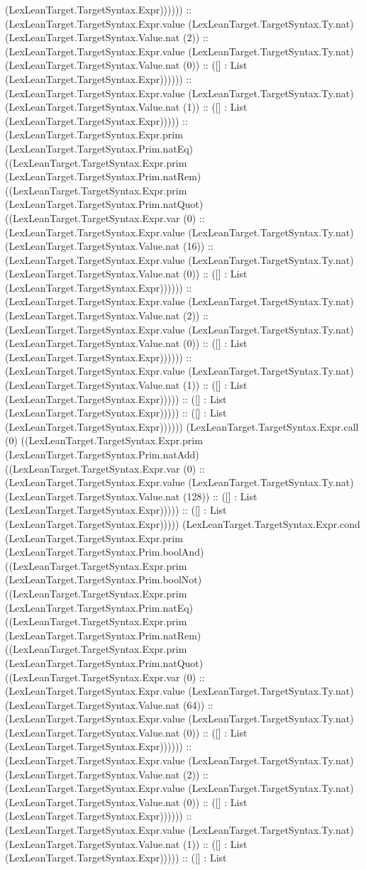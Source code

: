 \documentclass[11pt]{article}
\begin{document}
(LexLeanTarget.TargetSyntax.Expr)))))) :: (LexLeanTarget.TargetSyntax.Expr.value (LexLeanTarget.TargetSyntax.Ty.nat) (LexLeanTarget.TargetSyntax.Value.nat (2)) :: (LexLeanTarget.TargetSyntax.Expr.value (LexLeanTarget.TargetSyntax.Ty.nat) (LexLeanTarget.TargetSyntax.Value.nat (0)) :: ([] : List (LexLeanTarget.TargetSyntax.Expr)))))) :: (LexLeanTarget.TargetSyntax.Expr.value (LexLeanTarget.TargetSyntax.Ty.nat) (LexLeanTarget.TargetSyntax.Value.nat (1)) :: ([] : List (LexLeanTarget.TargetSyntax.Expr))))) :: (LexLeanTarget.TargetSyntax.Expr.prim (LexLeanTarget.TargetSyntax.Prim.natEq) ((LexLeanTarget.TargetSyntax.Expr.prim (LexLeanTarget.TargetSyntax.Prim.natRem) ((LexLeanTarget.TargetSyntax.Expr.prim (LexLeanTarget.TargetSyntax.Prim.natQuot) ((LexLeanTarget.TargetSyntax.Expr.var (0) :: (LexLeanTarget.TargetSyntax.Expr.value (LexLeanTarget.TargetSyntax.Ty.nat) (LexLeanTarget.TargetSyntax.Value.nat (16)) :: (LexLeanTarget.TargetSyntax.Expr.value (LexLeanTarget.TargetSyntax.Ty.nat) (LexLeanTarget.TargetSyntax.Value.nat (0)) :: ([] : List (LexLeanTarget.TargetSyntax.Expr)))))) :: (LexLeanTarget.TargetSyntax.Expr.value (LexLeanTarget.TargetSyntax.Ty.nat) (LexLeanTarget.TargetSyntax.Value.nat (2)) :: (LexLeanTarget.TargetSyntax.Expr.value (LexLeanTarget.TargetSyntax.Ty.nat) (LexLeanTarget.TargetSyntax.Value.nat (0)) :: ([] : List (LexLeanTarget.TargetSyntax.Expr)))))) :: (LexLeanTarget.TargetSyntax.Expr.value (LexLeanTarget.TargetSyntax.Ty.nat) (LexLeanTarget.TargetSyntax.Value.nat (1)) :: ([] : List (LexLeanTarget.TargetSyntax.Expr))))) :: ([] : List (LexLeanTarget.TargetSyntax.Expr))))) :: ([] : List (LexLeanTarget.TargetSyntax.Expr)))))) (LexLeanTarget.TargetSyntax.Expr.call (0) ((LexLeanTarget.TargetSyntax.Expr.prim (LexLeanTarget.TargetSyntax.Prim.natAdd) ((LexLeanTarget.TargetSyntax.Expr.var (0) :: (LexLeanTarget.TargetSyntax.Expr.value (LexLeanTarget.TargetSyntax.Ty.nat) (LexLeanTarget.TargetSyntax.Value.nat (128)) :: ([] : List (LexLeanTarget.TargetSyntax.Expr))))) :: ([] : List (LexLeanTarget.TargetSyntax.Expr))))) (LexLeanTarget.TargetSyntax.Expr.cond (LexLeanTarget.TargetSyntax.Expr.prim (LexLeanTarget.TargetSyntax.Prim.boolAnd) ((LexLeanTarget.TargetSyntax.Expr.prim (LexLeanTarget.TargetSyntax.Prim.boolNot) ((LexLeanTarget.TargetSyntax.Expr.prim (LexLeanTarget.TargetSyntax.Prim.natEq) ((LexLeanTarget.TargetSyntax.Expr.prim (LexLeanTarget.TargetSyntax.Prim.natRem) ((LexLeanTarget.TargetSyntax.Expr.prim (LexLeanTarget.TargetSyntax.Prim.natQuot) ((LexLeanTarget.TargetSyntax.Expr.var (0) :: (LexLeanTarget.TargetSyntax.Expr.value (LexLeanTarget.TargetSyntax.Ty.nat) (LexLeanTarget.TargetSyntax.Value.nat (64)) :: (LexLeanTarget.TargetSyntax.Expr.value (LexLeanTarget.TargetSyntax.Ty.nat) (LexLeanTarget.TargetSyntax.Value.nat (0)) :: ([] : List (LexLeanTarget.TargetSyntax.Expr)))))) :: (LexLeanTarget.TargetSyntax.Expr.value (LexLeanTarget.TargetSyntax.Ty.nat) (LexLeanTarget.TargetSyntax.Value.nat (2)) :: (LexLeanTarget.TargetSyntax.Expr.value (LexLeanTarget.TargetSyntax.Ty.nat) (LexLeanTarget.TargetSyntax.Value.nat (0)) :: ([] : List (LexLeanTarget.TargetSyntax.Expr)))))) :: (LexLeanTarget.TargetSyntax.Expr.value (LexLeanTarget.TargetSyntax.Ty.nat) (LexLeanTarget.TargetSyntax.Value.nat (1)) :: ([] : List (LexLeanTarget.TargetSyntax.Expr))))) :: ([] : List 
\end{document}
